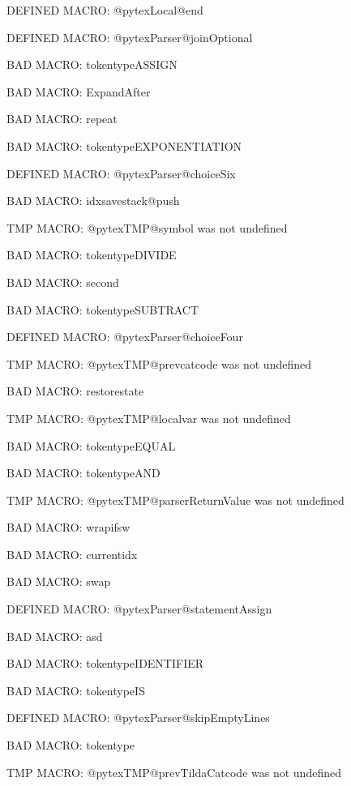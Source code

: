 \ifx\@pytexLocal@end\undefined\else DEFINED MACRO: @pytexLocal@end
\fi

\ifx\@pytexParser@joinOptional\undefined\else DEFINED MACRO: @pytexParser@joinOptional
\fi

BAD MACRO: tokentypeASSIGN

BAD MACRO: ExpandAfter

BAD MACRO: repeat

BAD MACRO: tokentypeEXPONENTIATION

\ifx\@pytexParser@choiceSix\undefined\else DEFINED MACRO: @pytexParser@choiceSix
\fi

BAD MACRO: idxsavestack@push

\ifx\@pytexTMP@symbol\undefined\else TMP MACRO: @pytexTMP@symbol was not undefined
\fi

BAD MACRO: tokentypeDIVIDE

BAD MACRO: second

BAD MACRO: tokentypeSUBTRACT

\ifx\@pytexParser@choiceFour\undefined\else DEFINED MACRO: @pytexParser@choiceFour
\fi

\ifx\@pytexTMP@prevcatcode\undefined\else TMP MACRO: @pytexTMP@prevcatcode was not undefined
\fi

BAD MACRO: restorestate

\ifx\@pytexTMP@localvar\undefined\else TMP MACRO: @pytexTMP@localvar was not undefined
\fi

BAD MACRO: tokentypeEQUAL

BAD MACRO: tokentypeAND

\ifx\@pytexTMP@parserReturnValue\undefined\else TMP MACRO: @pytexTMP@parserReturnValue was not undefined
\fi

BAD MACRO: wrapifsw

BAD MACRO: currentidx

BAD MACRO: swap

\ifx\@pytexParser@statementAssign\undefined\else DEFINED MACRO: @pytexParser@statementAssign
\fi

BAD MACRO: asd

BAD MACRO: tokentypeIDENTIFIER

BAD MACRO: tokentypeIS

\ifx\@pytexParser@skipEmptyLines\undefined\else DEFINED MACRO: @pytexParser@skipEmptyLines
\fi

BAD MACRO: tokentype

\ifx\@pytexTMP@prevTildaCatcode\undefined\else TMP MACRO: @pytexTMP@prevTildaCatcode was not undefined
\fi

